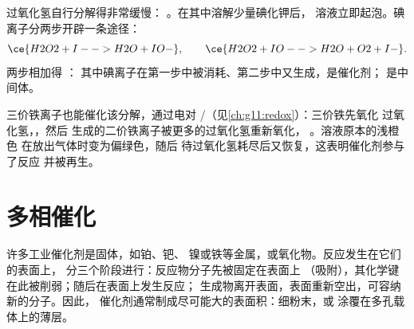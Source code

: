 \begin{example}[碘离子与过氧化氢]\label{ex:g12:catalysis:iodide}
过氧化氢自行分解得非常缓慢：
。在其中溶解少量碘化钾后，
溶液立即起泡。碘离子分两步开辟一条途径：
\[
  \ce{H2O2 + I- -> H2O + IO-}, \qquad
  \ce{H2O2 + IO- -> H2O + O2 + I-} .
\]
两步相加得 ：
其中碘离子在第一步中被消耗、第二步中又生成，是催化剂；
 是中间体。
\end{example}


\begin{example}[三价铁离子]\label{ex:g12:catalysis:iron}
三价铁离子也能催化该分解，通过电对
/（见\cref{ch:g11:redox}）：三价铁先氧化
过氧化氢，，然后
生成的二价铁离子被更多的过氧化氢重新氧化，
。溶液原本的浅橙色
在放出气体时变为偏绿色，随后
待过氧化氢耗尽后又恢复，这表明催化剂参与了反应
并被再生。
\end{example}

\section{多相催化}

许多工业催化剂是固体，如铂、钯、
镍或铁等金属，或氧化物。反应发生在它们的表面上，
分三个阶段进行：反应物分子先被固定在表面上
（吸附），其化学键在此被削弱；随后在表面上发生反应；
生成物离开表面，表面重新空出，可容纳新的分子。因此，
催化剂通常制成尽可能大的表面积：细粉末，或
涂覆在多孔载体上的薄层。

